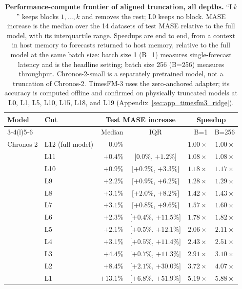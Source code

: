 \documentclass{article} %
\begin{document}
\begin{table}[p]
\centering
\caption{\textbf{Performance-compute frontier of aligned truncation, all depths.} ``L$k$'' keeps
blocks $1,\dots,k$ and removes the rest; L0 keeps no block. MASE increase is the median over the
14 datasets of test MASE relative to the full model, with its interquartile range. Speedups are
end to end, from a context in host memory to forecasts returned to host memory, relative to the
full model at the same batch size: batch size 1 (B=1) measures single-forecast latency and is the
headline setting; batch size 256 (B=256) measures throughput. Chronos-2-small is a separately
pretrained model, not a truncation of Chronos-2. TimesFM-3 uses the zero-anchored adapter; its
accuracy is computed offline and confirmed on physically truncated models at L0, L1, L5, L10, L15,
L18, and L19 (Appendix~\ref{sec:app_timesfm3_ridge}).}
\vspace{4pt}
\label{tab:h4_frontier_full}
\small
\setlength{\tabcolsep}{5pt}
\begin{tabular}{@{}llrcrr@{}}
\toprule
Model & Cut & \multicolumn{2}{c}{Test MASE increase} & \multicolumn{2}{c}{Speedup} \\
\cmidrule(lr){3-4}\cmidrule(l){5-6}
 & & Median & IQR & B=1 & B=256 \\
\midrule
Chronos-2 & L12 (full model) & $0.0\%$ &  & $1.00\times$ & $1.00\times$ \\
 & L11 & $+0.4\%$ & [$0.0\%$, $+1.2\%$] & $1.08\times$ & $1.08\times$ \\
 & L10 & $+0.9\%$ & [$+0.2\%$, $+3.3\%$] & $1.18\times$ & $1.17\times$ \\
 & L9 & $+2.2\%$ & [$+0.9\%$, $+6.2\%$] & $1.28\times$ & $1.29\times$ \\
 & L8 & $+3.1\%$ & [$+2.0\%$, $+8.2\%$] & $1.42\times$ & $1.43\times$ \\
 & L7 & $+3.1\%$ & [$+0.8\%$, $+9.6\%$] & $1.57\times$ & $1.60\times$ \\
 & L6 & $+2.3\%$ & [$+0.4\%$, $+11.5\%$] & $1.78\times$ & $1.82\times$ \\
 & L5 & $+2.1\%$ & [$+0.5\%$, $+12.1\%$] & $2.06\times$ & $2.11\times$ \\
 & L4 & $+3.1\%$ & [$+0.5\%$, $+11.4\%$] & $2.43\times$ & $2.51\times$ \\
 & L3 & $+4.4\%$ & [$+0.7\%$, $+11.3\%$] & $2.91\times$ & $3.10\times$ \\
 & L2 & $+8.4\%$ & [$+2.1\%$, $+30.0\%$] & $3.72\times$ & $4.07\times$ \\
 & L1 & $+13.1\%$ & [$+6.8\%$, $+51.9\%$] & $5.19\times$ & $5.88\times$ \\

\end{tabular}
\end{table}
\end{document}
